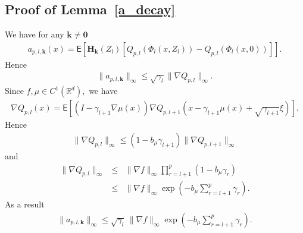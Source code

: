 \documentclass[aap,preprint]{imsart}
\begin{document}
\subsection{Proof of Lemma~\ref{a_decay}}

We have for any \(\mathbf{k}\neq \mathbf{0}\)
\begin{eqnarray*}
a_{p,l,\mathbf{k}}(x)=\mathsf{E}\left[\mathbf{H}_\mathbf{k}\left(Z_l\right)[Q_{p,l}\left(\Phi_l(x,Z_l)\right)-Q_{p,l}\left(\Phi_l(x,0)\right)]\right].
\end{eqnarray*}
Hence
\begin{eqnarray*}
\|a_{p,l,\mathbf{k}}\|_{\infty}\leq \sqrt{\gamma_l}\|\nabla Q_{p,l}\|_{\infty}.
\end{eqnarray*}
Since \(f,\mu\in C^1(\mathbb{R}^d),\)  we have
\begin{eqnarray*}
\nabla Q_{p,l}(x)=\mathsf{E}\left[(I-\gamma_{l+1}\nabla\mu(x))\nabla Q_{p,l+1}(x-\gamma_{l+1}\mu(x)+\sqrt{\gamma_{l+1}}\xi)\right].
\end{eqnarray*}
Hence
\begin{eqnarray*}
\|\nabla Q_{p,l}\|_\infty\leq (1-b_{\mu}\gamma_{l+1})\|\nabla Q_{p,l+1}\|_\infty
\end{eqnarray*}
and
\begin{eqnarray*}
\|\nabla Q_{p,l}\|_\infty&\leq & \|\nabla f\|_\infty\prod_{r=l+1}^p (1-b_{\mu}\gamma_{r})
\\
&\leq & \|\nabla f\|_\infty\exp\left(-b_{\mu}\sum_{r=l+1}^p \gamma_{r}  \right).
\end{eqnarray*}
As a result
\begin{eqnarray*}
\|a_{p,l,\mathbf{k}}\|_{\infty}\leq \sqrt{\gamma_l}\, \|\nabla f\|_\infty\exp\left(-b_{\mu}\sum_{r=l+1}^p \gamma_{r}  \right).
\end{eqnarray*}




\end{document}
